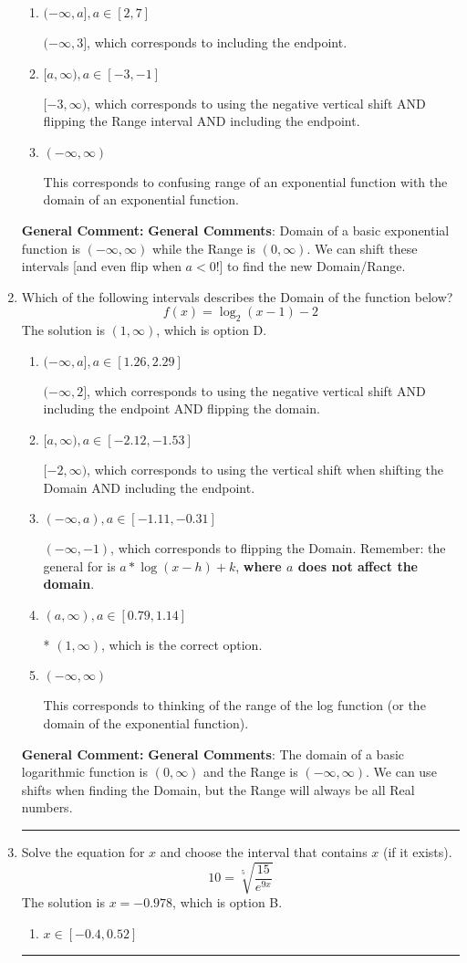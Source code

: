 \documentclass{extbook}[14pt]
\newcommand{\litem}[1]{\item #1

\rule{\textwidth}{0.4pt}}
\begin{document}
\begin{enumerate}
{\begin{enumerate}[label=\Alph*.]
$(-3, \infty)$, which corresponds to using the negative vertical shift AND flipping the Range interval.
\item \( (-\infty, a], a \in [2, 7] \)

$(-\infty, 3]$, which corresponds to including the endpoint.
\item \( [a, \infty), a \in [-3, -1] \)

$[-3, \infty)$, which corresponds to using the negative vertical shift AND flipping the Range interval AND including the endpoint.
\item \( (-\infty, \infty) \)

This corresponds to confusing range of an exponential function with the domain of an exponential function.
\end{enumerate}

\textbf{General Comment:} \textbf{General Comments}: Domain of a basic exponential function is $(-\infty, \infty)$ while the Range is $(0, \infty)$. We can shift these intervals [and even flip when $a<0$!] to find the new Domain/Range.
}
\litem{
Which of the following intervals describes the Domain of the function below?
\[ f(x) = \log_2{(x-1)}-2 \]
The solution is \( (1, \infty) \), which is option D.\begin{enumerate}[label=\Alph*.]
\item \( (-\infty, a], a \in [1.26, 2.29] \)

$(-\infty, 2]$, which corresponds to using the negative vertical shift AND including the endpoint AND flipping the domain.
\item \( [a, \infty), a \in [-2.12, -1.53] \)

$[-2, \infty)$, which corresponds to using the vertical shift when shifting the Domain AND including the endpoint.
\item \( (-\infty, a), a \in [-1.11, -0.31] \)

$(-\infty, -1)$, which corresponds to flipping the Domain. Remember: the general for is $a*\log(x-h)+k$, \textbf{where $a$ does not affect the domain}.
\item \( (a, \infty), a \in [0.79, 1.14] \)

* $(1, \infty)$, which is the correct option.
\item \( (-\infty, \infty) \)

This corresponds to thinking of the range of the log function (or the domain of the exponential function).
\end{enumerate}

\textbf{General Comment:} \textbf{General Comments}: The domain of a basic logarithmic function is $(0, \infty)$ and the Range is $(-\infty, \infty)$. We can use shifts when finding the Domain, but the Range will always be all Real numbers.
}
\litem{
 Solve the equation for $x$ and choose the interval that contains $x$ (if it exists).
\[  10 = \sqrt[5]{\frac{15}{e^{9x}}} \]
The solution is \( x = -0.978 \), which is option B.\begin{enumerate}[label=\Alph*.]
\item \( x \in [-0.4, 0.52] \)


\end{enumerate}}
\end{enumerate}
\end{document}
